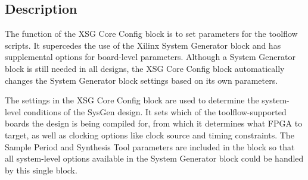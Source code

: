 \documentclass{article}
\newenvironment{PortTable}{\subsection*{Ports}
\tabularx{6.5in}{|l|l|l|X|} \hline  \textbf{Port} & \textbf{Dir.} & \textbf{Data Type} & \textbf{Description} \\ \hline}{\endtabularx}
\newcommand{\Port}[4]{\emph{#1} & \lowercase{#2} & #3 & #4\\  \hline}
\newcommand{\BlockDesc}[1]{\subsection*{Description}#1}
\newcommand{\tabularx}[3]{\begin{tabularx}{#1}{#2}{#3}}
\newcommand{\endtabularx}{\end{tabularx}}
\begin{document}
\begin{comment}
\begin{PortTable}
\Port{Port Name}{Port Direction}{Port data type}{Port Description}
\Port{Port Name}{in}{ufix\_x\_y}{Port Description}
\Port{Port Name}{in}{inherited}{Port Description}
\end{PortTable}
\end{comment}

\BlockDesc{The function of the XSG Core Config block is to set parameters for
the toolflow scripts. It supercedes the use of the Xilinx System Generator block
and has supplemental options for board-level parameters. Although a System
Generator block is still needed in all designs, the XSG Core Config block
automatically changes the System Generator block settings based on its own
parameters.

The settings in the XSG Core Config block are used to determine the system-%
level conditions of the SysGen design. It sets which of the toolflow-supported
boards the design is being compiled for, from which it determines what FPGA to
target, as well as clocking options like clock source and timing constraints.
The Sample Period and Synthesis Tool parameters are included in the block so
that all system-level options available in the System Generator block could
be handled by this single block.}
 
\end{document}
